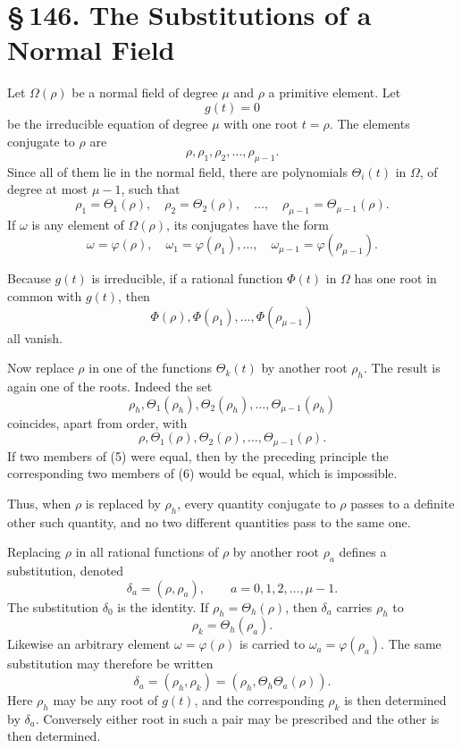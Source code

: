 \documentclass[11pt]{article}
\providecommand{\sect}[2]{\section*{\S\,#1. #2}}
\begin{document}
\sect{146}{The Substitutions of a Normal Field}

Let $\Omega(\rho)$ be a normal field of degree $\mu$ and $\rho$ a primitive element. Let
\[
\tag{1}
        g(t)=0
\]
be the irreducible equation of degree $\mu$ with one root $t=\rho$. The elements conjugate to $\rho$ are
\[
\tag{2}
        \rho,\rho_1,\rho_2,\ldots,\rho_{\mu-1}.
\]
Since all of them lie in the normal field, there are polynomials $\Theta_i(t)$ in $\Omega$, of degree at most $\mu-1$, such that
\[
\tag{3}
        \rho_1=\Theta_1(\rho),\quad
        \rho_2=\Theta_2(\rho),\quad\ldots,\quad
        \rho_{\mu-1}=\Theta_{\mu-1}(\rho).
\]
If $\omega$ is any element of $\Omega(\rho)$, its conjugates have the form
\[
\tag{4}
        \omega=\varphi(\rho),\quad
        \omega_1=\varphi(\rho_1),\ldots,\quad
        \omega_{\mu-1}=\varphi(\rho_{\mu-1}).
\]

Because $g(t)$ is irreducible, if a rational function $\Phi(t)$ in $\Omega$ has one root in common with $g(t)$, then
\[
        \Phi(\rho),\Phi(\rho_1),\ldots,\Phi(\rho_{\mu-1})
\]
all vanish.

Now replace $\rho$ in one of the functions $\Theta_k(t)$ by another root $\rho_h$. The result is again one of the roots. Indeed the set
\[
\tag{5}
        \rho_h,\Theta_1(\rho_h),\Theta_2(\rho_h),\ldots,\Theta_{\mu-1}(\rho_h)
\]
coincides, apart from order, with
\[
\tag{6}
        \rho,\Theta_1(\rho),\Theta_2(\rho),\ldots,\Theta_{\mu-1}(\rho).
\]
If two members of (5) were equal, then by the preceding principle the corresponding two members of (6) would be equal, which is impossible.

Thus, when $\rho$ is replaced by $\rho_h$, every quantity conjugate to $\rho$ passes to a definite other such quantity, and no two different quantities pass to the same one.

Replacing $\rho$ in all rational functions of $\rho$ by another root $\rho_a$ defines a substitution, denoted
\[
        \delta_a=(\rho,\rho_a),\qquad a=0,1,2,\ldots,\mu-1.
\]
The substitution $\delta_0$ is the identity. If $\rho_h=\Theta_h(\rho)$, then $\delta_a$ carries $\rho_h$ to
\[
        \rho_k=\Theta_h(\rho_a).
\]
Likewise an arbitrary element $\omega=\varphi(\rho)$ is carried to $\omega_a=\varphi(\rho_a)$. The same substitution may therefore be written
\[
\tag{9}
        \delta_a=(\rho_h,\rho_k)=(\rho_h,\Theta_h\Theta_a(\rho)).
\]
Here $\rho_h$ may be any root of $g(t)$, and the corresponding $\rho_k$ is then determined by $\delta_a$. Conversely either root in such a pair may be prescribed and the other is then determined.
\end{document}
